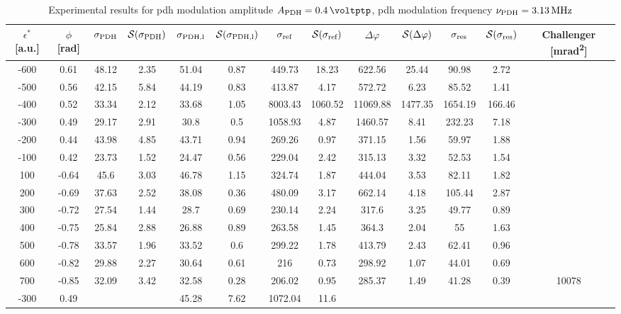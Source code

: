 \begin{landscape}
	\begin{table}
	\centering
	\begin{tabular}{|c|c|c|c|c|c|c|c|c|c|c|c|c|}
		\hline
		$\epsilon^*$ [a.u.] & $\phi$ [\si{\radian}] & $\sigma_{\text{PDH}}$ & $\mathcal{S}(\sigma_{\text{PDH}})$ & $\sigma_{\text{PDH,l}}$ & $\mathcal{S}(\sigma_{\text{PDH,l}})$  & $\sigma_{\text{ref}}$ & $\mathcal{S}(\sigma_{\text{ref}})$ & $\Delta \varphi$ & $\mathcal{S}(\Delta \varphi)$ & $\sigma_{\text{res}}$  & $\mathcal{S}(\sigma_{\text{res}})$ & Challenger [\si{\milli\radian\squared}] \\
		\hline
		\hline
		-600 & 0.61 & 48.12 & 2.35 & 51.04 & 0.87 & 449.73 & 18.23 & 622.56 & 25.44 & 90.98 & 2.72 & \\
		-500 & 0.56 & 42.15 & 5.84 & 44.19 & 0.83 & 413.87 & 4.17 & 572.72 & 6.23 & 85.52 & 1.41 & \\
		-400 & 0.52 & 33.34 & 2.12 & 33.68 & 1.05 & 8003.43 & 1060.52 & 11069.88 & 1477.35 & 1654.19 & 166.46 & \\
		-300 & 0.49 & 29.17 & 2.91 & 30.8 & 0.5 & 1058.93 & 4.87 & 1460.57 & 8.41 & 232.23 & 7.18 & \\
		-200 & 0.44 & 43.98 & 4.85 & 43.71 & 0.94 & 269.26 & 0.97 & 371.15 & 1.56 & 59.97 & 1.88 & \\
		-100 & 0.42 & 23.73 & 1.52 & 24.47 & 0.56 & 229.04 & 2.42 & 315.13 & 3.32 & 52.53 & 1.54 & \\
		100 & -0.64 & 45.6 & 3.03 & 46.78 & 1.15 & 324.74 & 1.87 & 444.04 & 3.53 & 82.11 & 1.82 & \\
		200 & -0.69 & 37.63 & 2.52 & 38.08 & 0.36 & 480.09 & 3.17 & 662.14 & 4.18 & 105.44 & 2.87 & \\
		300 & -0.72 & 27.54 & 1.44 & 28.7 & 0.69 & 230.14 & 2.24 & 317.6 & 3.25 & 49.77 & 0.89 & \\
		400 & -0.75 & 25.84 & 2.88 & 26.88 & 0.89 & 263.58 & 1.45 & 364.3 & 2.04 & 55 & 1.63 & \\
		500 & -0.78 & 33.57 & 1.96 & 33.52 & 0.6 & 299.22 & 1.78 & 413.79 & 2.43 & 62.41 & 0.96 & \\
		600 & -0.82 & 29.88 & 2.27 & 30.64 & 0.61 & 216 & 0.73 & 298.92 & 1.07 & 44.01 & 0.69 & \\
		700 & -0.85 & 32.09 & 3.42 & 32.58 & 0.28 & 206.02 & 0.95 & 285.37 & 1.49 & 41.28 & 0.39 & 10078\\
		\hline
		\hline
		-300 & 0.49 & & & 45.28 & 7.62 & 1072.04 & 11.6 & & & & & \\
		\hline
	\end{tabular}
	\caption{Experimental results for \gls{pdh} modulation amplitude $\tind{A}{PDH} = \SI{0.4}{\voltptp}$, \gls{pdh} modulation frequency $\nu_{\text{PDH}} = \SI{3.13}{\mega\hertz}$}
	\end{table}
	
\end{landscape}